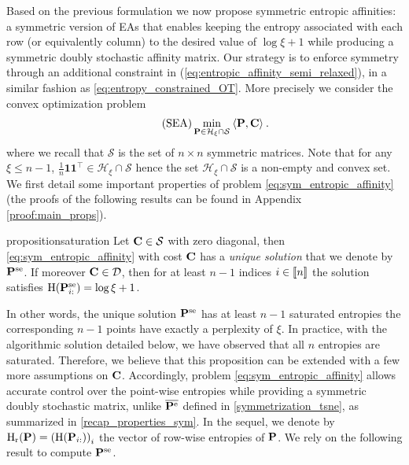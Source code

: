 Based on the previous formulation we now propose symmetric entropic affinities: a symmetric version of EAs that enables keeping the entropy associated with each row (or equivalently column) to the desired value of $\log \xi + 1$ while producing a symmetric doubly stochastic affinity matrix. Our strategy is to enforce symmetry through an additional constraint in (\ref{eq:entropic_affinity_semi_relaxed}), in a similar fashion as \eqref{eq:entropy_constrained_OT}. More precisely we consider the convex optimization problem
\begin{align}
\label{eq:sym_entropic_affinity}
\tag{SEA}
  \min_{\mathbf{P} \in \mathcal{H}_{\xi} \cap \mathcal{S}} \: \langle \mathbf{P}, \mathbf{C} \rangle \:. 
\end{align}
where we recall that $\mathcal{S}$ is the set of $n \times n$ symmetric matrices. Note that for any $\xi \leq n-1$, $\frac{1}{n} \bm{1}\bm{1}^\top \in \mathcal{H}_{\xi} \cap \mathcal{S}$ hence the set $\mathcal{H}_{\xi} \cap \mathcal{S}$ is a non-empty and convex set. We first detail some important properties of problem \eqref{eq:sym_entropic_affinity} (the proofs of the following results can be found in Appendix \ref{proof:main_props}).
\begin{restatable}{proposition}{saturation}
\label{prop:saturation_entropies}
Let $\mathbf{C} \in \mathcal{S}$ with zero diagonal, then \eqref{eq:sym_entropic_affinity} with cost $\mathbf{C}$ has a \emph{unique solution} that we denote by $\mathbf{P}^{\mathrm{se}}$. If moreover $\mathbf{C} \in \mathcal{D}$, then for at least $n-1$ indices $i \in {[\![n]\!]}$ the solution satisfies $\operatorname{H}(\mathbf{P}^{\mathrm{se}}_{i:}) = \log \xi + 1$.
\end{restatable}
In other words, the unique solution $\mathbf{P}^{\mathrm{se}}$ has at least $n-1$ saturated entropies \ie the corresponding $n-1$ points have exactly a perplexity of $\xi$. In practice, with the algorithmic solution detailed below, we have observed that all $n$ entropies are saturated. Therefore, we believe that this proposition can be extended with a few more assumptions on $\mathbf{C}$. Accordingly,
problem \eqref{eq:sym_entropic_affinity} allows accurate control over the point-wise entropies while providing a symmetric doubly stochastic matrix, unlike $\overline{\mathbf{P}^{\mathrm{e}}}$ defined in
\eqref{symmetrization_tsne}, as summarized in \cref{recap_properties_sym}. In the sequel, we denote by $\operatorname{H}_{\mathrm{r}}(\mathbf{P}) = \left( \operatorname{H}(\mathbf{P}_{i:}) \right)_{i}$ the vector of row-wise entropies of $\mathbf{P}$. We rely on the following result to compute $\mathbf{P}^{\mathrm{se}}$.
